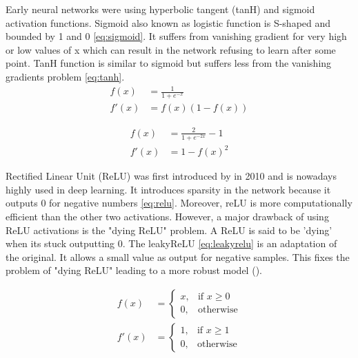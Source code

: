 Early neural networks were using hyperbolic tangent (tanH) and sigmoid activation functions. Sigmoid also known as logistic function is S-shaped and bounded by 1 and 0 \ref{eq:sigmoid}. It suffers from vanishing gradient for very high or low values of x which can result in the network refusing to learn after some point. TanH function is similar to sigmoid but suffers less from the vanishing gradients problem \ref{eq:tanh}.
\begin{equation}
    \label{eq:sigmoid}
    \begin{aligned}
    f(x) &= \frac{1}{1+e^{-x}} \\
    f'(x) &= f(x)(1 - f(x))
    \end{aligned}
\end{equation}

\begin{equation}
    \label{eq:tanh}
    \begin{aligned}
    f(x) &= \frac{2}{1+e^{-2x}} - 1 \\
    f'(x) &= 1 - f(x)^2
    \end{aligned}
\end{equation}

Rectified Linear Unit (ReLU) was first introduced by \citet{relu} in 2010 and is nowadays highly used in deep learning. It introduces sparsity in the network because it outputs 0 for negative numbers \ref{eq:relu}. Moreover, reLU is more computationally efficient than the other two activations. However, a major drawback of using ReLU activations is the "dying ReLU" problem. A ReLU is said to be 'dying' when its stuck outputting 0. The leakyReLU \ref{eq:leakyrelu} is an adaptation of the original. It allows a small value as output for negative samples. This fixes the problem of "dying ReLU" leading to a more robust model (\citet{leakyrelu}).

\begin{equation}
    \label{eq:relu}
    \begin{aligned}
    f(x) &=
    \begin{cases}
        x, & \text{if } x\geq 0 \\
        0, & \text{otherwise}
    \end{cases} \\
    f'(x) &=
    \begin{cases}
        1, & \text{if } x\geq 1 \\
        0, & \text{otherwise}
    \end{cases}
    \end{aligned}
\end{equation}

